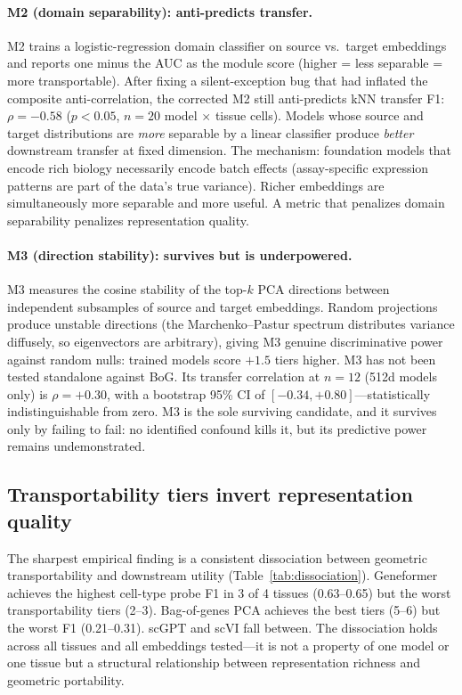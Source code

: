 \documentclass[9pt,lineno]{elife}
\begin{document}
\paragraph{M2 (domain separability): anti-predicts transfer.}

M2 trains a logistic-regression domain classifier on source vs.\ target embeddings and reports one minus the AUC as the module score (higher = less separable = more transportable). After fixing a silent-exception bug that had inflated the composite anti-correlation, the corrected M2 still anti-predicts kNN transfer F1: $\rho = -0.58$ ($p < 0.05$, $n = 20$ model $\times$ tissue cells). Models whose source and target distributions are \emph{more} separable by a linear classifier produce \emph{better} downstream transfer at fixed dimension. The mechanism: foundation models that encode rich biology necessarily encode batch effects (assay-specific expression patterns are part of the data's true variance). Richer embeddings are simultaneously more separable and more useful. A metric that penalizes domain separability penalizes representation quality.

\paragraph{M3 (direction stability): survives but is underpowered.}

M3 measures the cosine stability of the top-$k$ PCA directions between independent subsamples of source and target embeddings. Random projections produce unstable directions (the Marchenko--Pastur spectrum distributes variance diffusely, so eigenvectors are arbitrary), giving M3 genuine discriminative power against random nulls: trained models score $+1.5$ tiers higher. M3 has not been tested standalone against BoG. Its transfer correlation at $n = 12$ (512d models only) is $\rho = +0.30$, with a bootstrap 95\% CI of $[-0.34, +0.80]$---statistically indistinguishable from zero. M3 is the sole surviving candidate, and it survives only by failing to fail: no identified confound kills it, but its predictive power remains undemonstrated.

\subsection{Transportability tiers invert representation quality}

The sharpest empirical finding is a consistent dissociation between geometric transportability and downstream utility (Table~\ref{tab:dissociation}). Geneformer achieves the highest cell-type probe F1 in 3 of 4 tissues (0.63--0.65) but the worst transportability tiers (2--3). Bag-of-genes PCA achieves the best tiers (5--6) but the worst F1 (0.21--0.31). scGPT and scVI fall between. The dissociation holds across all tissues and all embeddings tested---it is not a property of one model or one tissue but a structural relationship between representation richness and geometric portability.
\end{document}
